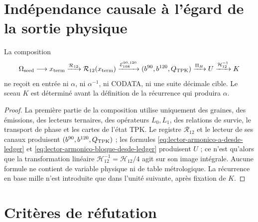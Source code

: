 \section{Indépendance causale à l’égard de la sortie physique}

\begin{theorem}[Isolement de \(U\) et \(K\)]
\label{thm:aislamiento-u-k-alpha-codata}
La composition
\begin{equation}
 \Omega_{\rm seed}\longrightarrow x_{\rm term}
 \xrightarrow{\mathcal R_{12}}
 \mathcal R_{12}(x_{\rm term})
 \xrightarrow{\mathcal E_{108}^{90,120}}
 (b^{90},b^{120},Q_{\rm TPK})
 \xrightarrow{\Pi_H}U
 \xrightarrow{\mathcal H_{12}^{-1}}K
 \label{eq:composicion-upstream-u-k}
\end{equation}
ne reçoit en entrée ni \(\alpha\), ni \(\alpha^{-1}\), ni CODATA, ni une suite
décimale cible. Le sceau \(K\) est déterminé avant la définition de la
récurrence qui produira \(\alpha\).
\end{theorem}

\begin{proof}
La première partie de la composition utilise uniquement des graines, des émissions, des lecteurs ternaires, des opérateurs \(L_0,L_1\), des relations de survie, le transport de phase et les cartes de l'état TPK. Le registre \(\mathcal R_{12}\) et le lecteur de ses canaux produisent \((b^{90},b^{120},Q_{\rm TPK})\) ; les formules \eqref{eq:lector-armonico-a-desde-ledger} et \eqref{eq:lector-armonico-bloque-desde-ledger} produisent \(U\) ; ce n'est qu'alors que la transformation linéaire \(\mathcal H_{12}^{-1}=\mathcal H_{12}/4\) agit sur son image intégrale. Aucune formule ne contient de variable physique ni de table métrologique. La récurrence en base mille n'est introduite que dans l'unité suivante, après fixation de \(K\).
\end{proof}

\section{Critères de réfutation}


